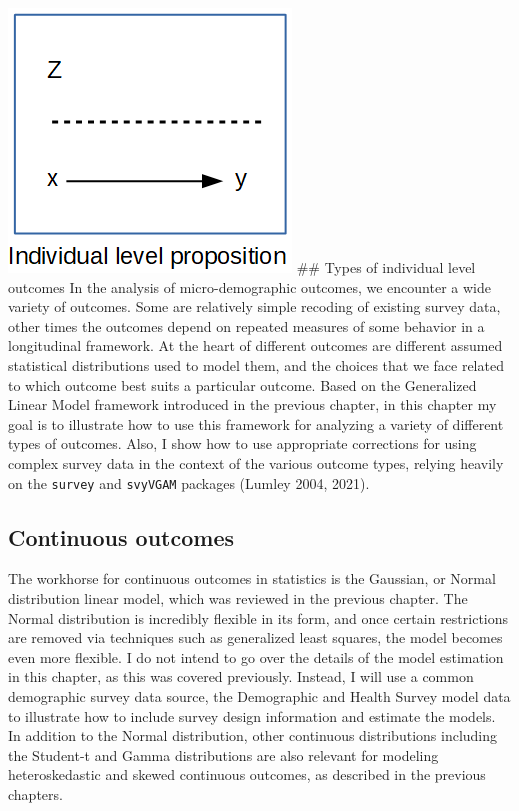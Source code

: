 \documentclass[
  letterpaper,
  DIV=11,
  numbers=noendperiod]{scrreprt}
\begin{document}
\includegraphics{./images/indi.png} \#\# Types of individual level
outcomes In the analysis of micro-demographic outcomes, we encounter a
wide variety of outcomes. Some are relatively simple recoding of
existing survey data, other times the outcomes depend on repeated
measures of some behavior in a longitudinal framework. At the heart of
different outcomes are different assumed statistical distributions used
to model them, and the choices that we face related to which outcome
best suits a particular outcome. Based on the Generalized Linear Model
framework introduced in the previous chapter, in this chapter my goal is
to illustrate how to use this framework for analyzing a variety of
different types of outcomes. Also, I show how to use appropriate
corrections for using complex survey data in the context of the various
outcome types, relying heavily on the \texttt{survey} and
\texttt{svyVGAM} packages (Lumley 2004, 2021).

\hypertarget{continuous-outcomes}{%
\subsection{Continuous outcomes}\label{continuous-outcomes}}

The workhorse for continuous outcomes in statistics is the Gaussian, or
Normal distribution linear model, which was reviewed in the previous
chapter. The Normal distribution is incredibly flexible in its form, and
once certain restrictions are removed via techniques such as generalized
least squares, the model becomes even more flexible. I do not intend to
go over the details of the model estimation in this chapter, as this was
covered previously. Instead, I will use a common demographic survey data
source, the Demographic and Health Survey model data to illustrate how
to include survey design information and estimate the models. In
addition to the Normal distribution, other continuous distributions
including the Student-t and Gamma distributions are also relevant for
modeling heteroskedastic and skewed continuous outcomes, as described in
the previous chapters.
\end{document}
